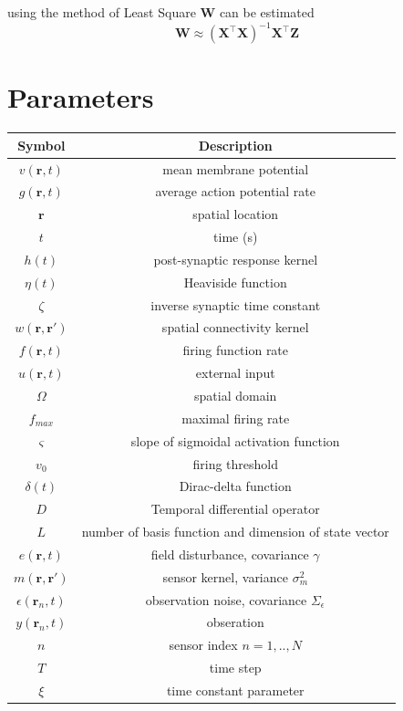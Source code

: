 \documentclass[12pt]{iopart}
\begin{document}
using the method of Least Square $ \mathbf W$ can be estimated 
\begin{equation}
	\mathbf W\approx(\mathbf X^\top\mathbf X)^{-1}\mathbf X^\top\mathbf Z 
\end{equation}
\section{Parameters} 
\begin{tabular}
	{c|c} \hline\hline Symbol & Description \\
	\hline $v(\mathbf{r},t)$ & mean membrane potential \\
	$g(\mathbf{r},t)$ & average action potential rate \\
	$\mathbf{r}$ & spatial location \\
	$t$ & time (s) \\
	$h(t)$ & post-synaptic response kernel \\
	$\eta(t)$ & Heaviside function \\
	$\zeta$ & inverse synaptic time constant \\
	$w(\mathbf{r},\mathbf{r}')$ & spatial connectivity kernel \\
	$f(\mathbf{r},t)$ & firing function rate \\
	$u(\mathbf{r},t)$ & external input \\
	$\Omega$ & spatial domain \\
	$f_{max}$ & maximal firing rate \\
	$\varsigma$ & slope of sigmoidal activation function \\
	$v_0$ & firing threshold \\
	$\delta(t)$ & Dirac-delta function \\
	$D$ & Temporal differential operator \\
	$L$ & number of basis function and dimension of state vector \\
	$e(\mathbf{r},t)$ & field disturbance, covariance $\gamma$\\
	$m(\mathbf{r},\mathbf{r}')$ & sensor kernel, variance $\sigma_m^2$ \\
	$\epsilon(\mathbf{r}_n,t)$ & observation noise, covariance $\Sigma_\epsilon$ \\
	$y(\mathbf{r}_n,t)$ & obseration \\
	$n$ & sensor index $n=1,..,N$ \\
	$T$ & time step \\
	$\xi$ & time constant parameter \\

\end{tabular}
\end{document}
